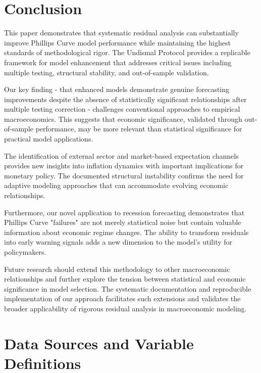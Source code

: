 \documentclass[12pt]{article}
\begin{document}
\section{Conclusion}

This paper demonstrates that systematic residual analysis can substantially improve Phillips Curve model performance while maintaining the highest standards of methodological rigor. The Undismal Protocol provides a replicable framework for model enhancement that addresses critical issues including multiple testing, structural stability, and out-of-sample validation.

Our key finding - that enhanced models demonstrate genuine forecasting improvements despite the absence of statistically significant relationships after multiple testing correction - challenges conventional approaches to empirical macroeconomics. This suggests that economic significance, validated through out-of-sample performance, may be more relevant than statistical significance for practical model applications.

The identification of external sector and market-based expectation channels provides new insights into inflation dynamics with important implications for monetary policy. The documented structural instability confirms the need for adaptive modeling approaches that can accommodate evolving economic relationships.

Furthermore, our novel application to recession forecasting demonstrates that Phillips Curve "failures" are not merely statistical noise but contain valuable information about economic regime changes. The ability to transform residuals into early warning signals adds a new dimension to the model's utility for policymakers.

Future research should extend this methodology to other macroeconomic relationships and further explore the tension between statistical and economic significance in model selection. The systematic documentation and reproducible implementation of our approach facilitates such extensions and validates the broader applicability of rigorous residual analysis in macroeconomic modeling.




\appendix

\section{Data Sources and Variable Definitions}
\end{document}
